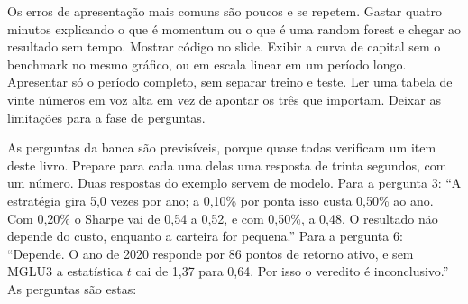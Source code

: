 Os erros de apresentação mais comuns são poucos e se repetem. Gastar quatro minutos explicando o que é momentum ou o que é uma random forest e chegar ao resultado sem tempo. Mostrar código no slide. Exibir a curva de capital sem o benchmark no mesmo gráfico, ou em escala linear em um período longo. Apresentar só o período completo, sem separar treino e teste. Ler uma tabela de vinte números em voz alta em vez de apontar os três que importam. Deixar as limitações para a fase de perguntas.

As perguntas da banca são previsíveis, porque quase todas verificam um item deste livro. Prepare para cada uma delas uma resposta de trinta segundos, com um número. Duas respostas do exemplo servem de modelo. Para a pergunta 3: ``A estratégia gira 5,0 vezes por ano; a 0,10\% por ponta isso custa 0,50\% ao ano. Com 0,20\% o Sharpe vai de 0,54 a 0,52, e com 0,50\%, a 0,48. O resultado não depende do custo, enquanto a carteira for pequena.'' Para a pergunta 6: ``Depende. O ano de 2020 responde por 86 pontos de retorno ativo, e sem MGLU3 a estatística $t$ cai de 1,37 para 0,64. Por isso o veredito é inconclusivo.'' As perguntas são estas:

